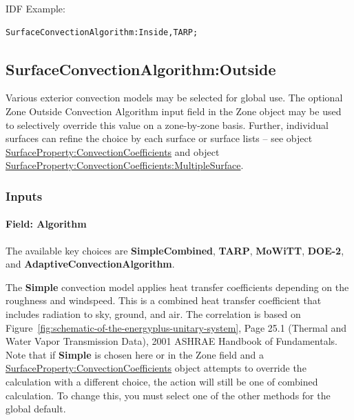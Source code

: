 IDF Example:

\begin{lstlisting}
SurfaceConvectionAlgorithm:Inside,TARP;
\end{lstlisting}

\subsection{SurfaceConvectionAlgorithm:Outside}\label{surfaceconvectionalgorithmoutside}

Various exterior convection models may be selected for global use. The optional Zone Outside Convection Algorithm input field in the Zone object may be used to selectively override this value on a zone-by-zone basis. Further, individual surfaces can refine the choice by each surface or surface lists -- see object \hyperref[surfacepropertyconvectioncoefficients]{SurfaceProperty:ConvectionCoefficients} and object \hyperref[surfacepropertyconvectioncoefficientsmultiplesurface]{SurfaceProperty:ConvectionCoefficients:MultipleSurface}.

\subsubsection{Inputs}\label{inputs-5-028}

\paragraph{Field: Algorithm}\label{field-algorithm-1-000}

The available key choices are \textbf{SimpleCombined}, \textbf{TARP}, \textbf{MoWiTT}, \textbf{DOE-2}, and \textbf{AdaptiveConvectionAlgorithm}.

The \textbf{Simple} convection model applies heat transfer coefficients depending on the roughness and windspeed. This is a combined heat transfer coefficient that includes radiation to sky, ground, and air. The correlation is based on Figure~\ref{fig:schematic-of-the-energyplus-unitary-system}, Page 25.1 (Thermal and Water Vapor Transmission Data), 2001 ASHRAE Handbook of Fundamentals. Note that if \textbf{Simple} is chosen here or in the Zone field and a \hyperref[surfacepropertyconvectioncoefficients]{SurfaceProperty:ConvectionCoefficients} object attempts to override the calculation with a different choice, the action will still be one of combined calculation. To change this, you must select one of the other methods for the global default.

